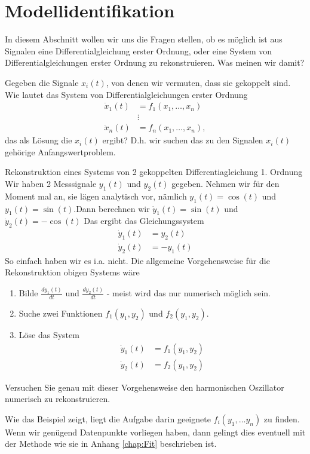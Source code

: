 \section{Modellidentifikation}
In diesem Abschnitt wollen wir uns die Fragen stellen, ob es möglich ist aus Signalen eine Differentialgleichung erster Ordnung, oder eine System von Differentialgleichungen erster Ordnung zu rekonstruieren. Was meinen wir damit? 

Gegeben die Signale $x_i(t)$, von denen wir vermuten, dass sie gekoppelt sind. Wie lautet das System von Differentialgleichungen erster Ordnung
\begin{align}
\dot{x}_1(t)&=f_1(x_1,\dots,x_n)\nonumber\\
&\vdots\nonumber\\
\dot{x}_n(t)&=f_n(x_1,\dots,x_n),
\label{eq:sys2reconstruct}
\end{align}
das als Lösung die $x_i(t)$ ergibt? D.h. wir suchen das zu den Signalen $x_i(t)$ gehörige Anfangswertproblem. 


\begin{example}{Rekonstruktion eines Systems von 2 gekoppelten  Differentiagleichung 1. Ordnung}
Wir haben 2 Messsignale $y_1(t)$ und $y_2(t)$ gegeben. Nehmen wir für den Moment mal an, sie lägen analytisch vor, nämlich $y_1(t)=\cos(t)$ und $y_1(t)=\sin(t)$.Dann berechnen wir $\dot y_1(t)=\sin(t)$ und $\dot y_2(t)=-\cos(t)$ Das ergibt das Gleichungssystem
\begin{align*}
\dot{y}_1(t)&=y_2(t)\\
\dot{y}_2(t)&=-y_1(t)
\end{align*}
So einfach haben wir es i.a. nicht. Die allgemeine Vorgehensweise für die Rekonstruktion obigen Systems wäre
\begin{enumerate}
    \item Bilde $\frac{d y_1(t)}{dt}$ und $\frac{d y_2(t)}{dt}$ - meist wird das nur numerisch möglich sein.
    \item Suche zwei Funktionen $f_1(y_1, y_2)$ und $f_2(y_1, y_2)$.
    \item Löse das System 
    \begin{align*}
        \dot{y}_1(t)&=f_1(y_1, y_2)\\
        \dot{y}_2(t)&=f_2(y_1, y_2)
    \end{align*}
\end{enumerate}
Versuchen Sie genau mit dieser Vorgehensweise den harmonischen Oszillator numerisch zu rekonstruieren.
\end{example}
Wie das Beispiel zeigt, liegt die Aufgabe darin geeignete $f_i(y_1,\dots  y_n)$ zu finden. Wenn wir genügend Datenpunkte vorliegen haben, dann gelingt dies eventuell mit der Methode wie sie in Anhang \ref{chap:Fit} beschrieben ist.